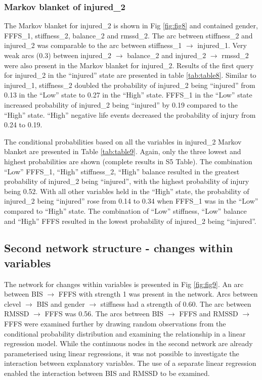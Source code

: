 \documentclass[
]{frontiersHLTH}
\begin{document}
\hypertarget{markov-blanket-of-injured_2}{%
\subsubsection{Markov blanket of
injured\_2}\label{markov-blanket-of-injured_2}}

The Markov blanket for injured\_2 is shown in Fig \ref{fig:fig8} and
contained gender, FFFS\_1, stiffness\_2, balance\_2 and rmssd\_2. The
arc between stiffness\_2 and injured\_2 was comparable to the arc
between stiffness\_1 \(\rightarrow\) injured\_1. Very weak arcs (0.3)
between injured\_2 \(\rightarrow\) balance\_2 and injured\_2
\(\rightarrow\) rmssd\_2 were also present in the Markov blanket for
injured\_2. Results of the first query for injured\_2 in the ``injured''
state are presented in table \ref{tab:table8}. Similar to injured\_1,
stiffness\_2 doubled the probability of injured\_2 being ``injured''
from 0.13 in the ``Low'' state to 0.27 in the ``High'' state. FFFS\_1 in
the ``Low'' state increased probability of injured\_2 being ``injured''
by 0.19 compared to the ``High'' state. ``High'' negative life events
decreased the probability of injury from 0.24 to 0.19.

The conditional probabilities based on all the variables in injured\_2
Markov blanket are presented in Table \ref{tab:table9}. Again, only the
three lowest and highest probabilities are shown (complete results in S5
Table). The combination ``Low'' FFFS\_1, ``High'' stiffness\_2, ``High''
balance resulted in the greatest probability of injured\_2 being
``injured'', with the highest probability of injury being 0.52. With all
other variables held in the ``High'' state, the probability of
injured\_2 being ``injured'' rose from 0.14 to 0.34 when FFFS\_1 was in
the ``Low'' compared to ``High'' state. The combination of ``Low''
stiffness, ``Low'' balance and ``High'' FFFS resulted in the lowest
probability of injured\_2 being ``injured''.

\hypertarget{second-network-structure---changes-within-variables}{%
\subsection{Second network structure - changes within
variables}\label{second-network-structure---changes-within-variables}}

The network for changes within variables is presented in Fig
\ref{fig:fig9}. An arc between BIS \(\rightarrow\) FFFS with strength 1
was present in the network. Arcs between clevel \(\rightarrow\) BIS and
gender \(\rightarrow\) stiffness had a strength of 0.60. The arc between
RMSSD \(\rightarrow\) FFFS was 0.56. The arcs between BIS
\(\rightarrow\) FFFS and RMSSD \(\rightarrow\) FFFS were examined
further by drawing random observations from the conditional probability
distribution and examining the relationship in a linear regression
model. While the continuous nodes in the second network are already
parameterised using linear regressions, it was not possible to
investigate the interaction between explanatory variables. The use of a
separate linear regression enabled the interaction between BIS and RMSSD
to be examined.
\end{document}

